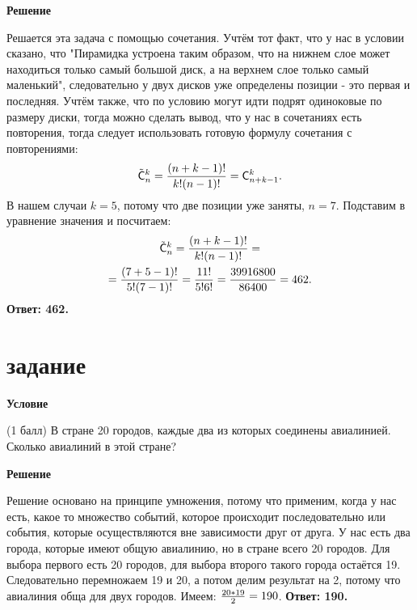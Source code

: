 \documentclass[a4paper]{article}
\begin{document}
\begin{center}
\begin{flushleft}
    \textbf{{\Large Решение}}
\end{flushleft}
\begin{flushleft}
    Решается эта задача с помощью сочетания. Учтём тот факт, что у нас в условии сказано, что "Пирамидка устроена таким образом, что на нижнем слое может находиться только самый большой диск, а на верхнем слое только самый маленький", следовательно у двух дисков уже определены позиции - это первая и последняя. Учтём также, что по условию могут идти подрят одиноковые по размеру диски, тогда можно сделать вывод, что у нас в сочетаниях есть повторения, тогда следует использовать готовую формулу сочетания с повторениями:
    \begin{gather*}\tilde{\sf C}_n^k={(n+k-1)!\over k!(n-1)!}={\sf C}_{n+k-1}^k.\end{gather*}
    В нашем случаи $k = 5$, потому что две позиции уже заняты, $n = 7$.
    Подставим в уравнение значения и посчитаем:
    \begin{gather*}\tilde{\sf C}_n^k={(n+k-1)!\over k!(n-1)!}=\\={(7+5-1)!\over 5!(7-1)!}={11!\over 5!6!}={39916800\over 86400}=462.\end{gather*}
    \textbf{Ответ: 462.}
\end{flushleft}

\section{задание}

\begin{flushleft}
    \textbf{{\Large Условие}}
\end{flushleft}
(1 балл) В стране 20 городов, каждые два из которых соединены авиалинией. Сколько авиалиний в этой стране?
\hfill \break

\begin{flushleft}
    \textbf{{\Large Решение}}
\end{flushleft}

\begin{flushleft}
    Решение основано на принципе умножения, потому что применим, когда у нас есть, какое то множество событий, которое происходит последовательно или события, которые осуществляются вне зависимости друг от друга. У нас есть два города, которые имеют общую авиалинию, но в стране всего 20 городов. Для выбора первого есть 20 городов, для выбора второго такого города остаётся 19. Следовательно перемножаем 19 и 20, а потом делим результат на 2, потому что авиалиния обща для двух городов. Имеем: ${20*19\over 2}={190}$.
    \textbf{Ответ: 190.}
\end{flushleft}


\end{center}
\end{document}
